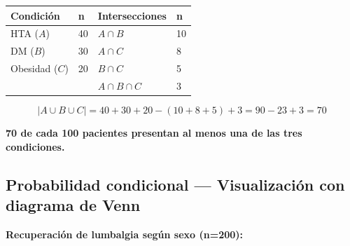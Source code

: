 \documentclass[
  letterpaper,
  DIV=11,
  numbers=noendperiod]{scrartcl}
\newcounter{none} %
\begin{document}
{\def\LTcaptype{none} %
\begin{longtable}[]{@{}llll@{}}
\toprule\noalign{}
Condición & n & Intersecciones & n \\
\midrule\noalign{}
\endhead
\bottomrule\noalign{}
\endlastfoot
HTA (\(A\)) & 40 & \(A \cap B\) & 10 \\
DM (\(B\)) & 30 & \(A \cap C\) & 8 \\
Obesidad (\(C\)) & 20 & \(B \cap C\) & 5 \\
& & \(A \cap B \cap C\) & 3 \\
\end{longtable}
}

\[|A \cup B \cup C| = 40 + 30 + 20 - (10 + 8 + 5) + 3 = 90 - 23 + 3 = 70\]

\textbf{70 de cada 100 pacientes presentan al menos una de las tres
condiciones.}

\subsection{Probabilidad condicional --- Visualización con diagrama de
Venn}\label{probabilidad-condicional-visualizacion-con-diagrama-de-venn}

\textbf{Recuperación de lumbalgia según sexo (n=200):}
\end{document}
